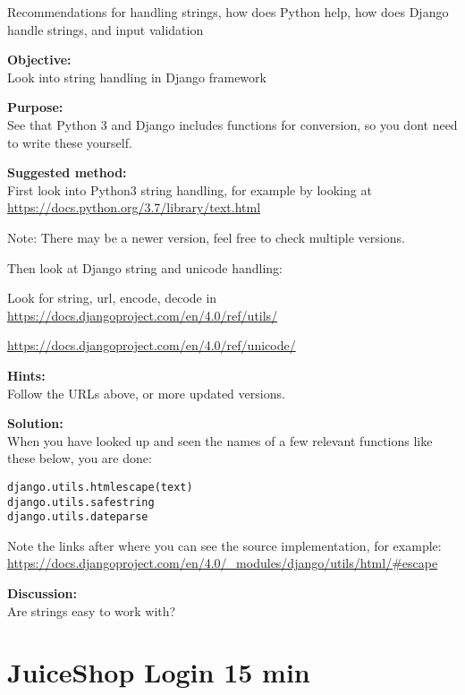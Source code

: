 \documentclass[a4paper,11pt,notitlepage]{report}
\begin{document}
Recommendations for handling strings, how does Python help, how does Django handle strings, and input validation

{\bf Objective:}\\
Look into string handling in Django framework

{\bf Purpose:}\\
See that Python 3 and Django includes functions for conversion, so you dont need to write these yourself.

{\bf Suggested method:}\\
First look into Python3 string handling, for example by looking at\\
\url{https://docs.python.org/3.7/library/text.html}

Note: There may be a newer version, feel free to check multiple versions.

Then look at Django string and unicode handling:
\begin{list2}
\item Look for string, url, encode, decode in\\
\url{https://docs.djangoproject.com/en/4.0/ref/utils/}
\item \url{https://docs.djangoproject.com/en/4.0/ref/unicode/}
\end{list2}

{\bf Hints:}\\
Follow the URLs above, or more updated versions.

{\bf Solution:}\\
When you have looked up and seen the names of a few relevant functions like these below, you are done:

\begin{alltt}
django.utils.html escape(text)
django.utils.safestring
django.utils.dateparse
\end{alltt}

Note the links after where you can see the source implementation, for example:\\
\url{https://docs.djangoproject.com/en/4.0/_modules/django/utils/html/#escape}


{\bf Discussion:}\\
Are strings easy to work with?




\chapter{JuiceShop Login 15 min}
\label{ex:juice-shop-login}
\end{document}
